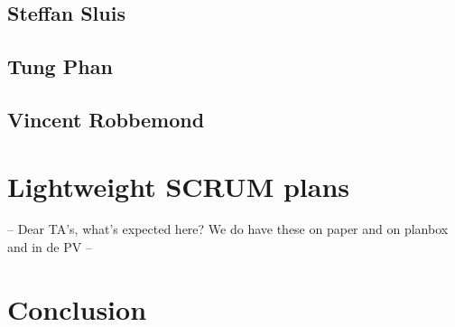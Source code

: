 \documentclass[10pt,a4paper]{report}
\begin{document}
		\subsection{Steffan Sluis}
			
		\subsection{Tung Phan}
			
		\subsection{Vincent Robbemond}
			
		
	\section{Lightweight SCRUM plans}
		-- Dear TA's, what's expected here? We do have these on paper and on planbox and in de PV --
	
		
	\section{Conclusion}
	
\end{document}
